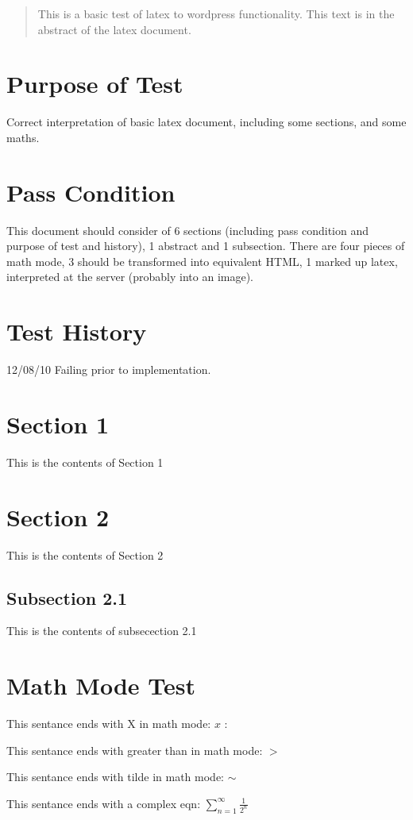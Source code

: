 \documentclass{book}
\begin{document}
\begin{abstract}
  This is a basic test of latex to wordpress functionality. This text is in
  the abstract of the latex document. 
\end{abstract}


\section{Purpose of Test}

Correct interpretation of basic latex document, including some sections, and
some maths.

\section{Pass Condition}

This document should consider of 6 sections (including pass condition and
purpose of test and history), 1 abstract and 1 subsection. There are four pieces of math
mode, 3 should be transformed into equivalent HTML, 1 marked up latex,
interpreted at the server (probably into an image). 

\section{Test History}

12/08/10 Failing prior to implementation. 


\section{Section 1}

This is the contents of Section 1

\section{Section 2}

This is the contents of Section 2

\subsection{Subsection 2.1}

This is the contents of subsecection 2.1

\section{Math Mode Test}

This sentance ends with X in math mode: $x$ :

This sentance ends with greater than in math mode: $>$

This sentance ends with tilde in math mode: $\sim$

This sentance ends with a complex eqn: $\sum_{n=1}^\infty \frac{1}{2^n}$
\end{document}
